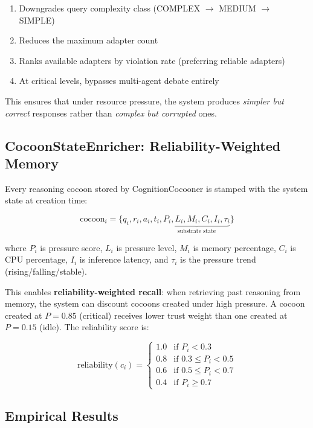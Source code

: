 \begin{enumerate}
    \item Downgrades query complexity class (COMPLEX $\to$ MEDIUM $\to$ SIMPLE)
    \item Reduces the maximum adapter count
    \item Ranks available adapters by violation rate (preferring reliable adapters)
    \item At critical levels, bypasses multi-agent debate entirely
\end{enumerate}

This ensures that under resource pressure, the system produces \emph{simpler
but correct} responses rather than \emph{complex but corrupted} ones.

\subsection{CocoonStateEnricher: Reliability-Weighted Memory}

Every reasoning cocoon stored by CognitionCocooner is stamped with the system
state at creation time:

\begin{equation}
\text{cocoon}_i = \{q_i, r_i, a_i, t_i, \underbrace{P_i, L_i, M_i, C_i, I_i, \tau_i}_{\text{substrate state}}\}
\end{equation}

where $P_i$ is pressure score, $L_i$ is pressure level, $M_i$ is memory
percentage, $C_i$ is CPU percentage, $I_i$ is inference latency, and $\tau_i$
is the pressure trend (rising/falling/stable).

This enables \textbf{reliability-weighted recall}: when retrieving past
reasoning from memory, the system can discount cocoons created under high
pressure. A cocoon created at $P = 0.85$ (critical) receives lower trust
weight than one created at $P = 0.15$ (idle). The reliability score is:

\begin{equation}
\text{reliability}(c_i) = \begin{cases}
1.0 & \text{if } P_i < 0.3 \\
0.8 & \text{if } 0.3 \leq P_i < 0.5 \\
0.6 & \text{if } 0.5 \leq P_i < 0.7 \\
0.4 & \text{if } P_i \geq 0.7
\end{cases}
\label{eq:reliability}
\end{equation}

\subsection{Empirical Results}

